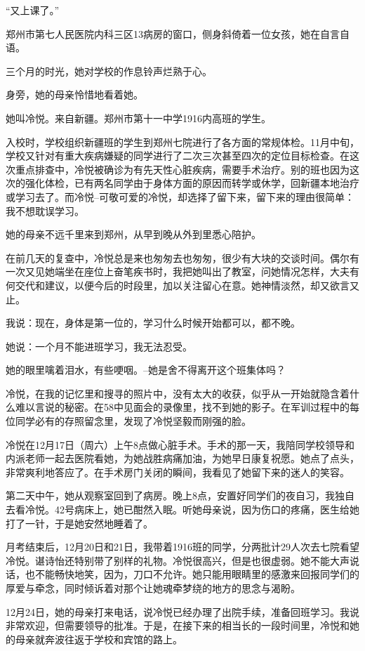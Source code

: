 \documentclass[openany]{ctexbook}
\begin{document}
``又上课了。''

郑州市第七人民医院内科三区13病房的窗口，侧身斜倚着一位女孩，她在自言自语。

三个月的时光，她对学校的作息铃声烂熟于心。

身旁，她的母亲怜惜地看着她。

她叫冷悦。来自新疆。郑州市第十一中学1916内高班的学生。

入校时，学校组织新疆班的学生到郑州七院进行了各方面的常规体检。11月中旬，学校又针对有重大疾病嫌疑的同学进行了二次三次甚至四次的定位目标检查。在这次重点排查中，冷悦被确诊为有先天性心脏疾病，需要手术治疗。别的班也因为这次的强化体检，已有两名同学由于身体方面的原因而转学或休学，回新疆本地治疗或学习去了。而冷悦--可敬可爱的冷悦，却选择了留下来，留下来的理由很简单：我不想耽误学习。

她的母亲不远千里来到郑州，从早到晚从外到里悉心陪护。

在前几天的复查中，冷悦总是来也匆匆去也匆匆，很少有大块的交谈时间。偶尔有一次又见她端坐在座位上奋笔疾书时，我把她叫出了教室，问她情况怎样，大夫有何交代和建议，以便今后的时段里，加以关注留心在意。她神情淡然，却又欲言又止。

我说：现在，身体是第一位的，学习什么时候开始都可以，都不晚。

她说：一个月不能进班学习，我无法忍受。

她的眼里噙着泪水，有些哽咽。--她是舍不得离开这个班集体吗？

冷悦，在我的记忆里和搜寻的照片中，没有太大的收获，似乎从一开始就隐含着什么难以言说的秘密。在58中见面会的录像里，找不到她的影子。在军训过程中的每位同学必有的存照留念里，发现了冷悦坚毅而刚强的脸。

冷悦在12月17日（周六）上午8点做心脏手术。手术的那一天，我陪同学校领导和内派老师一起去医院看她，为她战胜病痛加油，为她早日康复祝愿。她点了点头，非常爽利地答应了。在手术房门关闭的瞬间，我看见了她留下来的迷人的笑容。

第二天中午，她从观察室回到了病房。晚上8点，安置好同学们的夜自习，我独自去看冷悦。42号病床上，她已酣然入眠。听她母亲说，因为伤口的疼痛，医生给她打了一针，于是她安然地睡着了。

月考结束后，12月20日和21日，我带着1916班的同学，分两批计29人次去七院看望冷悦。谌诗怡还特别带了别样的礼物。冷悦很高兴，但是也很虚弱。她不能大声说话，也不能畅快地笑，因为，刀口不允许。她只能用眼睛里的感激来回报同学们的厚爱与牵念，同时倾诉着对那个让她魂牵梦绕的地方的思念与渴盼。

12月24日，她的母亲打来电话，说冷悦已经办理了出院手续，准备回班学习。我说非常欢迎，但需要领导的批准。于是，在接下来的相当长的一段时间里，冷悦和她的母亲就奔波往返于学校和宾馆的路上。
\end{document}
